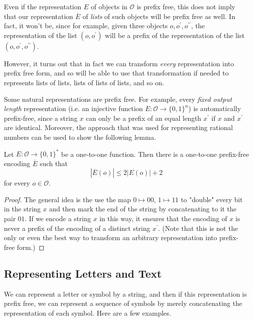 \documentclass{article}
\begin{document}
  Even if the representation $E$ of objects in $\mathcal{O}$ is prefix free, this does not imply that our representation $\overline{E}$ of \textit{lists} of such objects will be prefix free as well. In fact, it won't be, since for example, given three objects $o, o^\prime, o^{\prime\prime}$, the representation of the list $(o, o^\prime)$ will be a prefix of the representation of the list $(o, o^\prime, o^{\prime\prime})$.

  However, it turns out that in fact we can transform \textit{every} representation into prefix free form, and so will be able to use that transformation if needed to represents lists of lists, lists of lists of lists, and so on. 

  Some natural representations are prefix free. For example, every \textit{fixed output length} representation (i.e. an injective function $E: \mathcal{O} \longrightarrow \{0,1\}^n$) is automatically prefix-free, since a string $x$ can only be a prefix of an equal length $x^\prime$ if $x$ and $x^\prime$ are identical. Moreover, the approach that was used for representing rational numbers can be used to show the following lemma. 

  \begin{lemma}
  Let $E: \mathcal{O} \longrightarrow \{0,1\}^*$ be a one-to-one function. Then there is a one-to-one prefix-free encoding $\overline{E}$ such that 
  \[| \overline{E}(o)| \leq 2 | E(o)| + 2\]
  for every $o \in \mathcal{O}$. 
  \end{lemma}
  \begin{proof}
  The general idea is the use the map $0 \mapsto 00$, $1 \mapsto 11$ to "double" every bit in the string $x$ and then mark the end of the string by concatenating to it the pair $01$. If we encode a string $x$ in this way, it ensures that the encoding of $x$ is never a prefix of the encoding of a distinct string $x^\prime$. (Note that this is not the only or even the best way to transform an arbitrary representation into prefix-free form.)
  \end{proof}

  \subsection{Representing Letters and Text}
  We can represent a letter or symbol by a string, and then if this representation is prefix free, we can represent a sequence of symbols by merely concatenating the representation of each symbol. Here are a few examples. 
\end{document}
